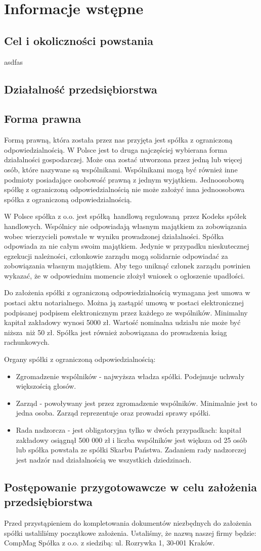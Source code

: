 \section{Informacje wstępne}
\subsection{Cel i okoliczności powstania}
asdfas
\subsection{Działalność przedsiębiorstwa}
\subsection{Forma prawna}
Formą prawną, która została przez nas przyjęta jest spółka z ograniczoną odpowiedzialnością. W Polsce jest to druga najczęściej wybierana forma działalności gospodarczej. Może ona zostać utworzona przez jedną lub więcej osób, które nazywane są wspólnikami. Wspólnikami mogą być również inne podmioty posiadające osobowość prawną z jednym wyjątkiem. Jednoosobową spółkę z ograniczoną odpowiedzialnością nie może założyć inna jednoosobowa spółka z ograniczoną odpowiedzialnością. 

W Polsce spółka z o.o. jest spółką handlową regulowaną przez Kodeks spółek handlowych. Wspólnicy nie odpowiadają własnym majątkiem za zobowiązania wobec wierzycieli powstałe w wyniku prowadzonej działalności. Spółka odpowiada za nie całym swoim majątkiem. Jedynie w przypadku nieskutecznej egzekucji należności, członkowie zarządu mogą solidarnie odpowiadać za zobowiązania własnym majątkiem. Aby tego uniknąć członek zarządu powinien wykazać, że w odpowiednim momencie złożył wniosek o ogłoszenie upadłości. 

Do założenia spółki z ograniczoną odpowiedzialnością wymagana jest umowa w postaci aktu notarialnego. Można ją zastąpić umową w postaci elektronicznej podpisanej podpisem elektronicznym przez każdego ze wspólników. Minimalny kapitał zakładowy wynosi 5000 zł. Wartość nominalna udziału nie może być niższa niż 50 zł. Spółka jest również zobowiązana do prowadzenia ksiąg rachunkowych.

Organy spółki z ograniczoną odpowiedzialnością:
\begin{itemize}
	\item Zgromadzenie wspólników - najwyższa władza spółki. Podejmuje uchwały większością głosów. 
	\item Zarząd - powoływany jest przez zgromadzenie wspólników. Minimalnie jest to jedna osoba. Zarząd reprezentuje oraz prowadzi sprawy spółki. 
	\item Rada nadzorcza - jest obligatoryjna tylko w dwóch przypadkach: kapitał zakładowy osiągnął 500 000 zł i liczba wspólników jest większa od 25 osób lub spółka powstała ze spółki Skarbu Państwa. Zadaniem rady nadzorczej jest nadzór nad działalnością we wszystkich dziedzinach.
\end{itemize}

\subsection{Postępowanie przygotowawcze w celu założenia przedsiębiorstwa}
Przed przystąpieniem do kompletowania dokumentów niezbędnych do założenia spółki ustaliliśmy początkowe założenia. Ustaliśmy, że nazwą naszej firmy będzie: CompMag Spółka z o.o. z siedzibą: ul. Rozrywka 1, 30-001 Kraków. 